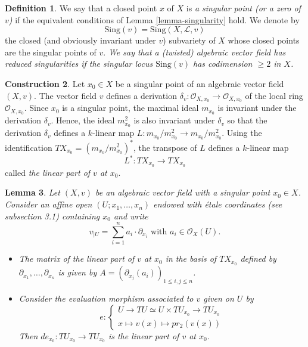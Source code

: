\documentclass[12pt]{amsart}
\theoremstyle{definition}
\newtheorem{definition}{Definition}[subsection]
\newtheorem{construction}[definition]{Construction}
\theoremstyle{plain}
\newtheorem{lemma}[definition]{Lemma}
\theoremstyle{exampstyle}
\theoremstyle{exampstyle}\newtheorem{thmxbis}{Theorem}
\numberwithin{equation}{section}
\theoremstyle{remark}
\begin{document}
\begin{definition} 
We say that a closed point $x$ of $X$ is {\em a singular point (or a zero of $v$)} if the equivalent conditions of Lemma \ref{lemma-singularity} hold. We denote by 
$$ \mathrm{Sing}(v) = \mathrm{Sing}(X,\mathcal L,v)$$
the closed (and obviously invariant under $v$) subvariety of $X$ whose closed points are the singular points of $v$. 
\textit{We say that a (twisted) algebraic vector field has {\em reduced singularities} if the singular locus $\mathrm{Sing}(v)$ has codimension $\geq 2$ in $X$.} 
\end{definition}


\begin{construction} 
Let $x_0 \in X$ be a singular point of an algebraic vector field $(X,v)$. The vector field $v$ defines a derivation 
$\delta_{v}: \mathcal O_{X,x_0} \rightarrow \mathcal O_{X,x_0}$
of the local ring $\mathcal O_{X,x_0}$. Since $x_0$ is a singular point, the maximal ideal $m_{x_0}$ is invariant under the derivation $\delta_v$. Hence, the ideal $m_{x_0}^2$ is also invariant under $\delta_v$ so that the derivation $\delta_v$ defines a $k$-linear map
$L: m_{x_0}/m_{x_0}^2 \rightarrow m_{x_0}/m_{x_0}^2$. Using the identification $TX_{x_0} = (m_{x_0}/m_{x_0}^2)^\ast$, the transpose of $L$ defines a $k$-linear map
$$L^\ast: TX_{x_0} \rightarrow TX_{x_0}$$
called \textit{the linear part of $v$ at $x_0$}. \end{construction}



\begin{lemma} \label{lemma-linearpart}
Let $(X,v)$ be an algebraic vector field with a singular point $x_0 \in X$. Consider an affine open $(U;x_1,\ldots,x_n)$ endowed with étale coordinates (see subsection 3.1) containing $x_0$ and write 
$$ v_{\mid U} = \sum_{i = 1}^n a_i \cdot \partial_{x_i}\text{ with } a_i \in \mathcal O_X(U).$$ 
\begin{itemize} 
\item[(i)] The matrix of the linear part of $v$ at $x_0$ in the basis of $TX_{x_0}$ defined by $\partial_{x_1}, \ldots, \partial_{x_n}$ is given by 
$A = (\partial_{x_j}(a_i))_{ 1\leq i,j \leq n }$. 
\item[(ii)] Consider the evaluation morphism associated to $v$ given on $U$ by 
$$e : \begin{cases} U   \rightarrow TU \simeq U \times TU_{x_0}  \rightarrow TU_{x_0} \\
x  \mapsto v(x)   \mapsto pr_2(v(x))
\end{cases} 
$$ 
Then $de_{x_0}: TU_{x_0} \rightarrow TU_{x_0}$ is the linear part of $v$ at $x_0$.
\end{itemize} 
\end{lemma} 
\end{document}
